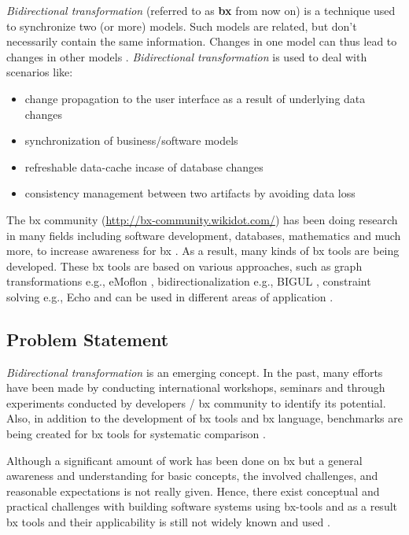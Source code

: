 \textit{Bidirectional transformation} (referred to as \textbf{bx} from now on) is a technique used to synchronize two (or more) models. Such models are related, but don't necessarily contain the same information. Changes in one model can thus lead to changes in other models \cite{bx-grace}.
\newline\newline\textit{Bidirectional transformation} is used to deal with scenarios like\cite{bx-theoryandappl}:
\begin{itemize}
	\item {change propagation to the user interface as a result of underlying data changes}	
	\item {synchronization of business/software models}
	\item {refreshable data-cache incase of database changes}
	\item {consistency management between two artifacts by avoiding data loss}
\end{itemize}
The bx community (\url{http://bx-community.wikidot.com/}) has been doing research in many fields including software development, databases, mathematics and much more, to increase awareness for bx \cite{bx-grace}\cite{bx-dagstuhl}. As a result, many kinds of bx tools are being developed. These bx tools are based on various approaches, such as graph transformations e.g., eMoflon \cite{emoflon-part4}, bidirectionalization e.g., BIGUL \cite{bigul}, constraint solving e.g., Echo \cite{echo} and can be used in different areas of application \cite{bx-community}.

\subsection{Problem Statement}\label{subsec:probstmt}
\textit{Bidirectional transformation} is an emerging concept. In the past, many efforts have been made by conducting international workshops, seminars and through experiments conducted by developers / bx community to identify its potential. Also, in addition to the development of bx tools and bx language, benchmarks are being created for bx tools for systematic comparison \cite{benchmark-BX}.

Although a significant amount of work has been done on bx but a general awareness and understanding for basic concepts, the involved challenges, and reasonable expectations is not really given. Hence, there exist conceptual and practical challenges with building software systems using bx-tools and as a result bx tools and their applicability is still not widely known and used \cite{bx-theoryandappl}.

